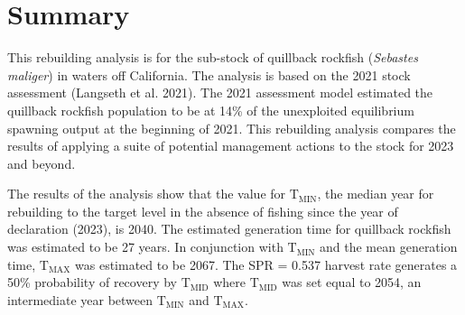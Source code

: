 \documentclass[11pt,
  english,
  a4paper,
]{article}
\begin{document}
\newcommand{\lt}{\ensuremath <}
\newcommand{\gt}{\ensuremath >}


\pagebreak
{}
\setcounter{page}{1}

\renewcommand{\thetable}{\roman{table}}
\renewcommand{\thefigure}{\roman{figure}}

\setlength\parskip{0.5em plus 0.1em minus 0.2em}


\hypertarget{summary}{%
\section*{Summary}\label{summary}}

\leavevmode\tagmcend\tagstructend


This rebuilding analysis is for the sub-stock of quillback rockfish (\emph{Sebastes maliger}) in waters off California. The analysis is based on the 2021 stock assessment {(Langseth et al. 2021)\leavevmode\tagmcend\tagstructend}. The 2021 assessment model estimated the quillback rockfish population to be at 14\% of the unexploited equilibrium spawning output at the beginning of 2021. This rebuilding analysis compares the results of applying a suite of potential management actions to the stock for 2023 and beyond.

\leavevmode\tagmcend\tagstructend\par


The results of the analysis show that the value for {\(\text{T}_\text{MIN}\)\leavevmode\tagmcend\tagstructend}, the median year for rebuilding to the target level in the absence of fishing since the year of declaration (2023), is 2040. The estimated generation time for quillback rockfish was estimated to be 27 years. In conjunction with {\(\text{T}_\text{MIN}\)\leavevmode\tagmcend\tagstructend} and the mean generation time, {\(\text{T}_\text{MAX}\)\leavevmode\tagmcend\tagstructend} was estimated to be 2067. The SPR = 0.537 harvest rate generates a 50\% probability of recovery by {\(\text{T}_\text{MID}\)\leavevmode\tagmcend\tagstructend} where {\(\text{T}_\text{MID}\)\leavevmode\tagmcend\tagstructend} was set equal to 2054, an intermediate year between {\(\text{T}_\text{MIN}\)\leavevmode\tagmcend\tagstructend} and {\(\text{T}_\text{MAX}\)\leavevmode\tagmcend\tagstructend}.
\end{document}
